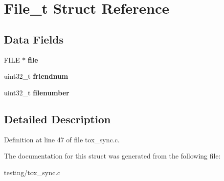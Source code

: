 \hypertarget{struct_file__t}{\section{File\+\_\+t Struct Reference}
\label{struct_file__t}
}
\subsection*{Data Fields}
\begin{DoxyCompactItemize}
\item 
\hypertarget{struct_file__t_a702945180aa732857b380a007a7e2a21}{F\+I\+L\+E $\ast$ {\bfseries file}}\label{struct_file__t_a702945180aa732857b380a007a7e2a21}

\item 
\hypertarget{struct_file__t_af02b3246ba69ea99fddd081f6e95598f}{uint32\+\_\+t {\bfseries friendnum}}\label{struct_file__t_af02b3246ba69ea99fddd081f6e95598f}

\item 
\hypertarget{struct_file__t_a32e4dffe2d73a1eeddb1bc8ce5511367}{uint32\+\_\+t {\bfseries filenumber}}\label{struct_file__t_a32e4dffe2d73a1eeddb1bc8ce5511367}

\end{DoxyCompactItemize}


\subsection{Detailed Description}


Definition at line 47 of file tox\+\_\+sync.\+c.



The documentation for this struct was generated from the following file\+:\begin{DoxyCompactItemize}
\item 
testing/tox\+\_\+sync.\+c\end{DoxyCompactItemize}
